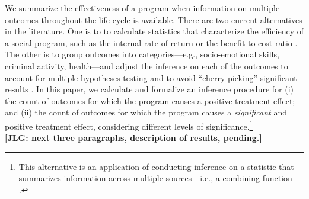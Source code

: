 \noindent We summarize the effectiveness of a program when information on multiple outcomes throughout the life-cycle is available. There are two current alternatives in the literature. One is to to calculate statistics that characterize the efficiency of a social program, such as the internal rate of return or the benefit-to-cost ratio \citep{Heckman_Moon_etal_2010_RateofReturn}. The other is to group outcomes into categories---e.g., socio-emotional skills, criminal activity, health---and adjust the inference on each of the outcomes to account for multiple hypotheses testing and to avoid ``cherry picking'' significant results \citep{Lehman_Romano_2005_AnnStat,Lehmann_Romano_2005_testing,Heckman_Moon_etal_2010_QE}. In this paper, we calculate and formalize an inference procedure for (i) the count of outcomes for which the program causes a positive treatment effect; and (ii) the count of outcomes for which the program causes a \emph{significant} and positive treatment effect, considering different levels of significance.\footnote{This alternative is an application of conducting inference on a statistic that summarizes information across multiple sources---i.e., a combining function \citep{Pesarin_Salmaso_2010_PermutationTests}.}\\

\noindent \textbf{[JLG: next three paragraphs, description of results, pending.]}\\


